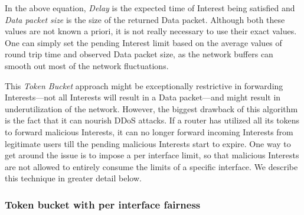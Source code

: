 In the above equation, \emph{Delay} is the expected time of Interest being satisfied and \emph{Data packet size} is the size of the returned Data packet.
Although both these values are not known a priori, it is not really necessary to use their exact values.
One can simply set the pending Interest limit based on the average values of round trip time and observed Data packet size, as the network buffers can smooth out most of the network fluctuations.

This {\it Token Bucket} approach might be exceptionally restrictive in forwarding Interests---not all Interests will result in a Data packet---and might result in underutilization of the network. However, the biggest drawback of this algorithm is the fact that it can nourish DDoS attacks. If a router has utilized all its tokens to forward malicious Interests, it can no longer forward incoming Interests from legitimate users till the pending malicious Interests start to expire. One way to get around the issue is to impose a per interface limit, so that malicious Interests are not allowed to entirely consume the limits of a specific interface. We describe this technique in greater detail below.

%
%
%


\subsubsection{\textbf{Token bucket with per interface fairness}}
\label{sec:queuing}


